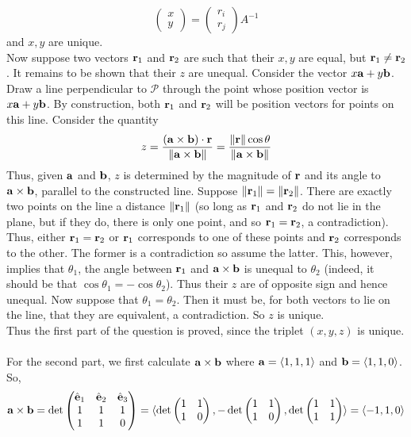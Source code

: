 \documentclass[12pt]{amsbook}
\newcommand{\la}{\langle}
\newcommand{\ra}{\rangle}
\begin{document}
$$\begin{pmatrix} x\\ y \end{pmatrix}= \begin{pmatrix} r_i\\ r_j \end{pmatrix}A^{-1}$$
and $x,y$ are unique.
\\
Now suppose two vectors ${\bf r}_1$ and ${\bf r}_2$  are such that their $x,y$ are equal, but ${\bf r}_1 \neq {\bf r}_2$. It remains to be shown that their $z$ are unequal. Consider the vector $x{\bf a}+y{\bf b}$. Draw a line perpendicular to $\mathcal{P}$ through the point whose position vector is $x{\bf a}+y{\bf b}$. By construction, both ${\bf r}_1$ and ${\bf r}_2$ will be position vectors for points on this line. Consider the quantity 
$$z=\frac{({\bf a}\times{\bf b})\cdot {\bf r}}{\|{\bf a}\times{\bf b}\|}=\frac{\|{\bf r}\|\cos \theta}{\|{\bf a}\times{\bf b}\|}$$
Thus, given ${\bf a}$ and ${\bf b}$, $z$ is determined by the magnitude of ${\bf r}$ and its angle to ${\bf a}\times{\bf b}$, parallel to the constructed line. Suppose $\|{\bf r}_1\|=\|{\bf r}_2\|$. There are exactly two points on the line a distance $\|{\bf r}_1\|$ (so long as ${\bf r}_1$ and ${\bf r}_2$ do not lie in the plane, but if they do, there is only one point, and so ${\bf r}_1={\bf r}_2$, a contradiction). Thus, either ${\bf r}_1={\bf r}_2$ or ${\bf r}_1$ corresponds to one of these points and ${\bf r}_2$ corresponds to the other. The former is a contradiction so assume the latter. This, however, implies that ${\theta}_1$, the angle between ${\bf r}_1$ and ${\bf a}\times {\bf b}$ is unequal to ${\theta}_2$ (indeed, it should be that $\cos \theta_1=-\cos \theta_2$). Thus their $z$ are of opposite sign and hence unequal. Now suppose that ${\theta}_1={\theta}_2$. Then it must be, for both vectors to lie on the line, that they are equivalent, a contradiction. So $z$ is unique.
\\
Thus the first part of the question is proved, since the triplet $(x,y,z)$ is unique.
\\
\\
For the second part, we first calculate ${\bf a}\times{\bf b}$ where ${\bf a}=\la 1,1,1\ra$ and ${\bf b}=\la 1,1,0\ra$. So,
$${\bf a}\times{\bf b}=\det
\begin{pmatrix}
\hat{\bf e}_1 & \hat{\bf e}_2 & \hat{\bf e}_3\cr 1&1&1\cr 1&1&0 \end{pmatrix}=\la \det\begin{pmatrix}1&1\cr 1&0  \end{pmatrix}, -\det\begin{pmatrix}
1&1\cr 1&0  \end{pmatrix}, \det\begin{pmatrix}
1&1\cr 1&1 \end{pmatrix} \ra = \la -1,1,0 \ra$$
\end{document}
